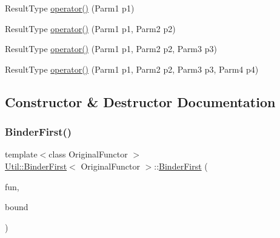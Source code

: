 \begin{DoxyCompactItemize}
\item 
Result\+Type \mbox{\hyperlink{classUtil_1_1BinderFirst_abaf2000002a79a24771bbf52ef7e960c}{operator()}} (Parm1 p1)
\item 
Result\+Type \mbox{\hyperlink{classUtil_1_1BinderFirst_a7abd5ef4f28a0496beb24d4295e1d181}{operator()}} (Parm1 p1, Parm2 p2)
\item 
Result\+Type \mbox{\hyperlink{classUtil_1_1BinderFirst_ac047de2a3489ae79b79d01e873e079c6}{operator()}} (Parm1 p1, Parm2 p2, Parm3 p3)
\item 
Result\+Type \mbox{\hyperlink{classUtil_1_1BinderFirst_ae11ec27f2d62ef1594ef033d8a9f3135}{operator()}} (Parm1 p1, Parm2 p2, Parm3 p3, Parm4 p4)
\end{DoxyCompactItemize}


\subsection{Constructor \& Destructor Documentation}
\mbox{\label{classUtil_1_1BinderFirst_a30caf0805ca9b22a13b3b79babd10054}} 
\subsubsection{\texorpdfstring{BinderFirst()}{BinderFirst()}\hspace{0.1cm}{\footnotesize\ttfamily [1/3]}}
{\footnotesize\ttfamily template$<$class Original\+Functor $>$ \\
\mbox{\hyperlink{classUtil_1_1BinderFirst}{Util\+::\+Binder\+First}}$<$ Original\+Functor $>$\+::\mbox{\hyperlink{classUtil_1_1BinderFirst}{Binder\+First}} (\begin{DoxyParamCaption}\item[{const Original\+Functor \&}]{fun,  }\item[{Bound\+Type}]{bound }\end{DoxyParamCaption})\hspace{0.3cm}{\ttfamily [inline]}}

\mbox{\label{classUtil_1_1BinderFirst_a30caf0805ca9b22a13b3b79babd10054}} 
